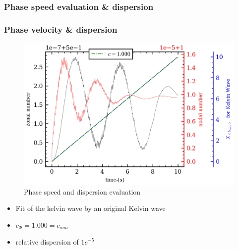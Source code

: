 \documentclass[numbering=fraction]{beamer}
\begin{document}
\subsubsection{Phase speed evaluation \& dispersion}
\begin{frame}
    \frametitle{Phase velocity \& dispersion}
    \begin{minipage}{.6\linewidth}

        \begin{figure}[H]
            \includegraphics[width=\linewidth]{./figure/kelvin_wave_param.png}
            \caption{Phase speed and dispersion evaluation}
        \end{figure}
    \end{minipage}
    \begin{minipage}{.3\linewidth}
        \begin{itemize}
            \item Fit of the kelvin wave by an original Kelvin wave
            \item $c_\Phi = 1.000 = c_{ana}$
            \item relative dispersion of $1e^{-5}$
        \end{itemize}
    \end{minipage}
\end{frame}
\end{document}

